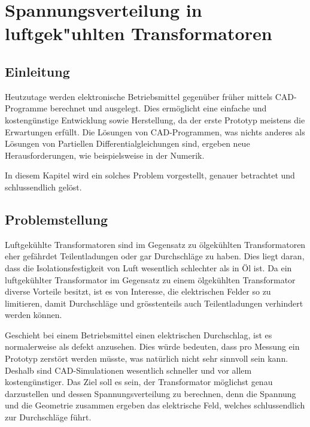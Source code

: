 \chapter{Spannungsverteilung in luftgek"uhlten Transformatoren\label{chapter:thema}}
\begin{refsection}

\section{Einleitung}

Heutzutage werden elektronische Betriebsmittel gegenüber früher mittels CAD-Programme berechnet und ausgelegt. Dies ermöglicht eine einfache und kostengünstige Entwicklung sowie Herstellung, da der erste Prototyp meistens die Erwartungen erfüllt. Die Lösungen von CAD-Programmen, was nichts anderes als Lösungen von Partiellen Differentialgleichungen sind, ergeben neue Herausforderungen, wie beispielsweise in der Numerik. 

In diesem Kapitel wird ein solches Problem vorgestellt, genauer betrachtet und schlussendlich gelöst.

\section{Problemstellung}

Luftgekühlte Transformatoren sind im Gegensatz zu ölgekühlten Transformatoren eher gefährdet Teilentladungen oder gar Durchschläge zu haben. Dies liegt daran, dass die Isolationsfestigkeit von Luft wesentlich schlechter als in Öl ist. Da ein luftgekühlter Transformator im Gegensatz zu einem ölgekühlten Transformator diverse Vorteile besitzt, ist es von Interesse, die elektrischen Felder so zu limitieren, damit Durchschläge und grösstenteils auch Teilentladungen verhindert werden können. 

Geschieht bei einem Betriebsmittel einen elektrischen Durchschlag, ist es normalerweise als defekt anzusehen. Dies würde bedeuten, dass pro Messung ein Prototyp zerstört werden müsste, was natürlich nicht sehr sinnvoll sein kann. Deshalb sind CAD-Simulationen wesentlich schneller und vor allem kostengünstiger. Das Ziel soll es sein, der Transformator möglichst genau darzustellen und dessen Spannungsverteilung zu berechnen, denn die Spannung und die Geometrie zusammen ergeben das elektrische Feld, welches schlussendlich zur Durchschläge führt.


\end{refsection}
